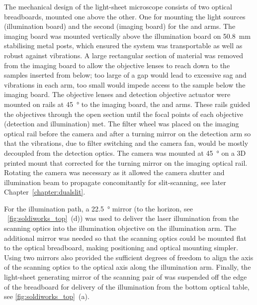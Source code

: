 The mechanical design of the \gls{light-sheet} microscope consists of two optical breadboards, mounted one above the other.
One for mounting the light sources (\gls{illumination board}) and the second (\gls{imaging board}) for the  and  arms.
The \gls{imaging board} was mounted vertically above the \gls{illumination board} on \SI{50.8}{\milli\metre} stabilising metal posts, which ensured the system was transportable as well as robust against vibrations.
A large rectangular section of material was removed from the \gls{imaging board} to allow the objective lenses to reach down to the samples inserted from below; too large of a gap would lead to excessive sag and vibrations in each arm, too small would impede access to the sample below the imaging board.
The objective lenses and detection objective actuator were mounted on rails at \SI{45}{\degree} to the \gls{imaging board}, the  and  arms.
These rails guided the objectives through the open section until the focal points of each objective (detection and illumination) met.
The filter wheel was placed on the \gls{imaging optical rail} before the camera and after a turning mirror on the \gls{detection arm}
so that the vibrations, due to
filter switching and the camera fan, would be mostly decoupled from the detection optics.
The camera was mounted at \SI{45}{\degree} on a \gls{3D} printed mount that corrected for the turning mirror on the \gls{imaging optical rail}.
Rotating the camera was necessary as it allowed the camera shutter and illumination beam to propagate concomitantly for slit-scanning, see later Chapter~\ref{chapter:dualslit}.

For the illumination path, a \SI{22.5}{\degree} mirror
(to the horizon, see \figurename~\ref{fig:soldiworks_top}~(d))
was used to deliver the laser illumination from the scanning optics into the illumination objective on the \gls{illumination arm}.
The additional mirror was needed so that the scanning optics could be mounted flat to the optical breadboard, making positioning and optical mounting simpler.
Using two mirrors also provided the sufficient degrees of freedom to align the axis of the scanning optics to the optical axis along the \gls{illumination arm}.
Finally, the light-sheet generating mirror of the scanning pair of was suspended off the edge of the breadboard for delivery of the  illumination from the bottom optical table, see \figurename\ref{fig:soldiworks_top}~(a).


